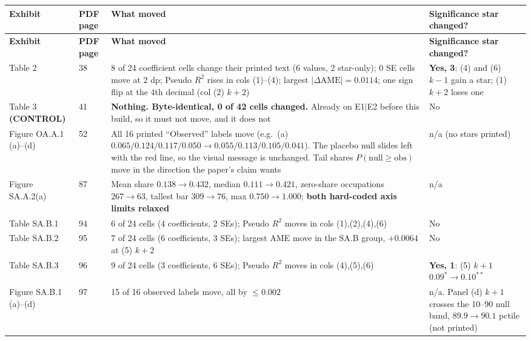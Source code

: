\documentclass[10pt]{article}
\newcommand{\ra}{\ensuremath{\rightarrow}}
\begin{document}
{\footnotesize
\begin{longtable}{@{}p{3.4cm}p{1.5cm}p{11.2cm}p{5.2cm}@{}}
\toprule
\textbf{Exhibit} & \textbf{PDF page} & \textbf{What moved} & \textbf{Significance star changed?} \\
\midrule
\endfirsthead
\toprule
\textbf{Exhibit} & \textbf{PDF page} & \textbf{What moved} & \textbf{Significance star changed?} \\
\midrule
\endhead
Table 2 & 38 &
8 of 24 coefficient cells change their printed text (6 values, 2 star-only); 0 SE cells move at 2 dp;
Pseudo $R^2$ rises in cols (1)--(4); largest $|\Delta\mathrm{AME}|=0.0114$; one sign flip at the
4th decimal (col (2) $k{+}2$) &
\textcolor{warncol}{\bfseries Yes, 3}: (4) and (6) $k{-}1$ gain a star; (1) $k{+}2$ loses one \\
\addlinespace
Table 3 \textbf{(CONTROL)} & 41 &
\textcolor{okcol}{\bfseries Nothing. Byte-identical, 0 of 42 cells changed.} Already on E1$|$E2 before
this build, so it must not move, and it does not &
\textcolor{okcol}{No} \\
\addlinespace
Figure OA.A.1 (a)--(d) & 52 &
All 16 printed ``Observed'' labels move (e.g.\ (a) $0.065/0.124/0.117/0.050 \ra 0.055/0.113/0.105/0.041$).
The placebo null slides left with the red line, so the visual message is unchanged.
Tail shares $P(\text{null}\!\geq\!\text{obs})$ move in the direction the paper's claim wants &
n/a (no stars printed) \\
\addlinespace
Figure SA.A.2(a) & 87 &
Mean share $0.138 \ra 0.432$, median $0.111 \ra 0.421$, zero-share occupations $267 \ra 63$,
tallest bar $309 \ra 76$, max $0.750 \ra 1.000$; \textbf{both hard-coded axis limits relaxed} &
n/a \\
\addlinespace
Table SA.B.1 & 94 &
6 of 24 cells (4 coefficients, 2 SEs); Pseudo $R^2$ moves in cols (1),(2),(4),(6) &
\textcolor{okcol}{No} \\
\addlinespace
Table SA.B.2 & 95 &
7 of 24 cells (6 coefficients, 3 SEs); largest AME move in the SA.B group, $+0.0064$ at (5) $k{+}2$ &
\textcolor{okcol}{No} \\
\addlinespace
Table SA.B.3 & 96 &
9 of 24 cells (3 coefficients, 6 SEs); Pseudo $R^2$ moves in cols (4),(5),(6) &
\textcolor{warncol}{\bfseries Yes, 1}: (5) $k{+}1$ $0.09^{*}\ra0.10^{**}$ \\
\addlinespace
Figure SA.B.1 (a)--(d) & 97 &
15 of 16 observed labels move, all by $\leq0.002$ &
n/a. Panel (d) $k{+}1$ crosses the 10--90 null band, $89.9 \ra 90.1$ pctile (not printed) \\

\end{longtable}}
\end{document}
